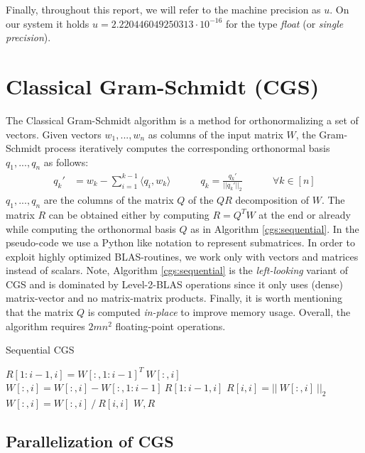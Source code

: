 \documentclass{article}
\begin{document}
Finally, throughout this report, we will refer to the machine precision as $u$.
On our system it holds $u = 2.220446049250313 \cdot 10^{-16}$ for the type
\textit{float} (or \textit{single precision}).

\section{Classical Gram-Schmidt (CGS)}

The Classical Gram-Schmidt algorithm is a method for orthonormalizing a set of
vectors. Given vectors $w_1, ..., w_n$ as columns of the input matrix $W$, the
Gram-Schmidt process iteratively computes the corresponding orthonormal basis
$q_1, ..., q_n$ as follows:
\begin{align}
        q_k' &= w_k - \sum_{i = 1}^{k-1} \langle q_i , w_k \rangle
        \quad \quad \quad q_k = \frac{q_k'}{||q_k'||_2}
        \quad \quad \quad \forall k \in [n]
\end{align}
$q_1, ..., q_n$ are the columns of the matrix $Q$ of the $QR$ decomposition of
$W$. The matrix $R$ can be obtained either by computing $R = Q^T W$ at the end
or already while computing the orthonormal basis $Q$ as in Algorithm
\ref{cgs:sequential}. In the pseudo-code we use a Python like notation to
represent submatrices. In order to exploit highly optimized BLAS-routines, we
work only with vectors and matrices instead of scalars. Note, Algorithm
\ref{cgs:sequential} is the \textit{left-looking} variant of CGS and is
dominated by Level-2-BLAS operations since it only uses (dense) matrix-vector
and no matrix-matrix products. Finally, it is worth mentioning that the matrix
$Q$ is computed \textit{in-place} to improve memory usage. Overall, the
algorithm requires $2mn^2$ floating-point operations.

\begin{algorithm}[t]
    \caption{Sequential CGS} \label{cgs:sequential}
    \begin{algorithmic}[1]
                \State $R[1:i-1,i] = W[:, 1:i-1]^T \ W[:, i]$
                \State $W[:, i] = W[:, i] - W[:, 1:i-1] \ R[1:i-1,i]$
            \EndIf
            \State $R[i,i] = || \ W[:,i] \ ||_2$
            \State $W[:,i] = W[:,i] \ / \ R[i,i]$
        \EndFor
        \State \Return $W, R$
    \end{algorithmic}
\end{algorithm}

\subsection{Parallelization of CGS}
\end{document}
